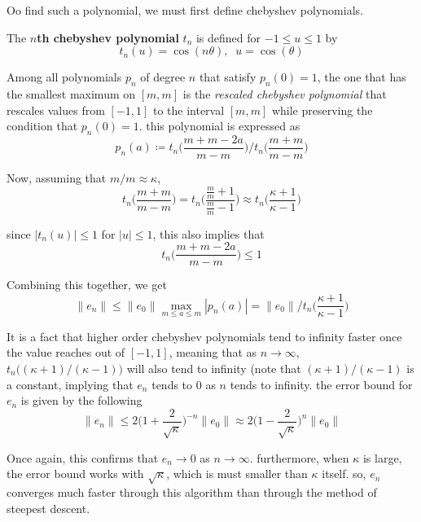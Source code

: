   Oo find such a polynomial, we must first define chebyshev polynomials. 

  \begin{definition}
    \label{def:nth-chebyshev-polynomial}
    The \textbf{$n$th chebyshev polynomial} $t_n$ is defined for $-1 \leq u \leq 1$ by
    \begin{equation}
      t_n (u) = \cos (n \theta), \;\; u = \cos(\theta)
    \end{equation}
  \end{definition}

  \begin{theorem}
    \label{thm:chebyshev-minimax-property}
    Among all polynomials $p_n$ of degree $n$ that satisfy $p_n (0) = 1$, the one that has the smallest maximum on $[m, m]$ is the \textit{rescaled chebyshev polynomial} that rescales values from $[-1, 1]$ to the interval $[m, m]$ while preserving the condition that $p_n (0) = 1$. this polynomial is expressed as
    \begin{equation}
      p_n (a) \coloneqq t_n \bigg( \frac{m+m-2a}{m-m} \bigg) \bigg/ t_n \bigg(\frac{m+m}{m-m} \bigg)
    \end{equation}
  \end{theorem} 

  Now, assuming that $m/m \approx \kappa$, 
  \begin{equation}
    t_n \bigg( \frac{m+m}{m-m} \bigg) = t_n \bigg(\frac{\frac{m}{m} + 1}{\frac{m}{m}-1} \bigg) \approx t_n \bigg(\frac{\kappa + 1}{\kappa - 1} \bigg)
  \end{equation}

  since $|t_n (u)| \leq 1$ for $|u| \leq 1$, this also implies that
  \begin{equation}
    t_n \bigg( \frac{m + m - 2a}{m-m} \bigg) \leq 1
  \end{equation}

  Combining this together, we get
  \begin{equation}
    \|e_n\| \leq \|e_0\| \max_{m \leq a \leq m} |p_n (a)| = \|e_0\| \bigg/ t_n \bigg( \frac{\kappa+1}{\kappa-1} \bigg)
  \end{equation}

  It is a fact that higher order chebyshev polynomials tend to infinity faster once the value reaches out of $[-1, 1]$, meaning that as $n \rightarrow \infty$, $t_n\big( (\kappa+1)/(\kappa-1)\big)$ will also tend to infinity (note that $(\kappa+1)/(\kappa-1)$ is a constant, implying that $e_n$ tends to $0$ as $n$ tends to infinity. the error bound for $e_n$ is given by the following 
  \begin{equation}
    \|e_n\| \leq 2 \bigg( 1 + \frac{2}{\sqrt{\kappa}} \bigg)^{-n} \|e_0\| \approx 2 \bigg( 1 - \frac{2}{\sqrt{\kappa}} \bigg)^{n} \|e_0\|
  \end{equation}

  Once again, this confirms that $e_n \rightarrow 0$ as $n \rightarrow \infty$. furthermore, when $\kappa$ is large, the error bound works with $\sqrt{\kappa}$, which is must smaller than $\kappa$ itself. so, $e_n$ converges much faster through this algorithm than through the method of steepest descent. 


